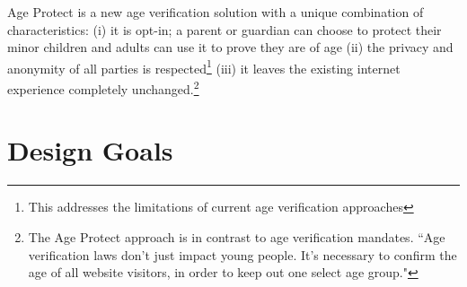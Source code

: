 \documentclass[11pt, oneside]{article}   	%
\begin{document}
Age Protect is a new age verification solution with a unique combination of characteristics: (i) it is opt-in; a parent or guardian can choose to protect their minor children and adults can use it to prove they are of age (ii) the privacy and anonymity of all parties is respected\footnote{This addresses the limitations of current age verification approaches\cite{Roth2023}} (iii) it leaves the existing internet experience completely unchanged.\footnote{The Age Protect approach is in contrast to age verification mandates. ``Age verification laws don’t just impact young people. It’s necessary to confirm the age of all website visitors, in order to keep out one select age group."\cite{Kelley2023}}

\section{Design Goals}
\end{document}
